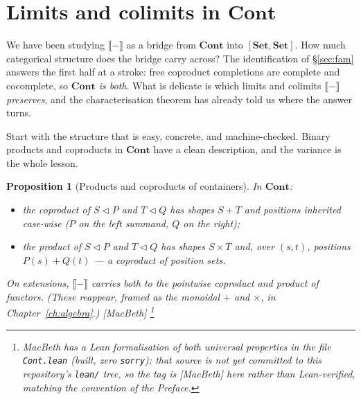 \documentclass[11pt,a4paper]{book}
\newcommand{\Set}{\mathbf{Set}}
\newcommand{\Cont}{\mathbf{Cont}}
\newcommand{\cont}[2]{#1 \triangleleft #2}
\newcommand{\Ext}[1]{\llbracket #1 \rrbracket}
\theoremstyle{plain}
\newtheorem{Proposition}[Theorem]{Proposition}
\theoremstyle{definition}
\theoremstyle{remark}
\newcommand{\prov}[1]{\hfill\textsf{\footnotesize[#1]}}
\begin{document}
\section{Limits and colimits in $\Cont$}
\label{sec:limits}

We have been studying $\Ext{-}$ as a bridge from $\Cont$ into $[\Set,\Set]$. How
much categorical structure does the bridge carry across? The identification of
\S\ref{sec:fam} answers the first half at a stroke: free coproduct completions are
complete and cocomplete, so \emph{$\Cont$ is both}. What is delicate is which limits
and colimits $\Ext{-}$ \emph{preserves}, and the characterisation theorem has
already told us where the answer turns.

Start with the structure that is easy, concrete, and machine-checked. Binary
products and coproducts in $\Cont$ have a clean description, and the variance is the
whole lesson.

\begin{Proposition}[Products and coproducts of containers]\label{prop:prodcoprod}
In $\Cont$:
\begin{itemize}[nosep]
\item the \emph{coproduct} of $\cont SP$ and $\cont TQ$ has shapes $S+T$ and
      positions inherited case-wise ($P$ on the left summand, $Q$ on the right);
\item the \emph{product} of $\cont SP$ and $\cont TQ$ has shapes $S\times T$ and,
      over $(s,t)$, positions $P(s)+Q(t)$ --- a \emph{coproduct} of position sets.
\end{itemize}
On extensions, $\Ext{-}$ carries both to the pointwise coproduct and product of
functors. (These reappear, framed as the monoidal $+$ and $\times$, in
Chapter~\ref{ch:algebra}.)
\prov{MacBeth}%
\footnote{MacBeth has a Lean formalisation of both universal properties in the file
\texttt{Cont.lean} (built, zero \texttt{sorry}); that source is \emph{not yet
committed} to this repository's \texttt{lean/} tree, so the tag is \textsf{[MacBeth]}
here rather than \textsf{Lean-verified}, matching the convention of the Preface.}
\end{Proposition}
\end{document}
